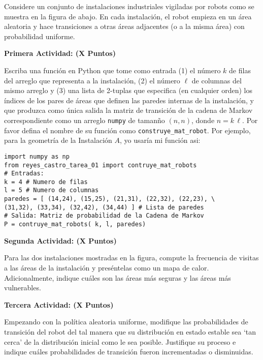 \documentclass[ a4paper, twoside, 11pt]{article}
\begin{document}
\begin{problem}
Considere un conjunto de instalaciones industriales vigiladas por robots como se muestra en la figura de abajo. En cada instalaci\'on, el robot empieza en un \'area aleatoria y hace transiciones a otras \'areas adjacentes (o a la misma \'area) con probabilidad uniforme. 

\begin{figure}[htb]
\centering
\def\svgwidth{0.9\columnwidth}

\end{figure}

\textbf{Primera Actividad: (X Puntos)}

Escriba una funci\'on en Python que tome como entrada (1) el n\'umero $k$ de filas del arreglo que representa a la instalaci\'on, (2) el n\'umero $\ell$ de columnas del mismo arreglo y (3) una lista de 2-tuplas que especifica (en cualquier orden) los \'indices de los pares de \'areas que definen las paredes internas de la instalaci\'on, y que produzca como \'unica salida la matriz de transici\'on de la cadena de Markov correspondiente como un arreglo {\tt numpy} de taman\~no $(n,n)$, donde $n = k \, \ell$. Por favor defina el nombre de su funci\'on como {\tt construye\_mat\_robot}. Por ejemplo, para la geometr\'ia de la Instalaci\'on $A$, yo usar\'ia mi funci\'on asi:
\halfskip

\begin{center}
\begin{minipage}{0.9\textwidth}
\begin{verbatim}
import numpy as np
from reyes_castro_tarea_01 import contruye_mat_robots
# Entradas:
k = 4 # Numero de filas
l = 5 # Numero de columnas
paredes = [ (14,24), (15,25), (21,31), (22,32), (22,23), \
(31,32), (33,34), (32,42), (34,44) ] # Lista de paredes
# Salida: Matriz de probabilidad de la Cadena de Markov
P = contruye_mat_robots( k, l, paredes)
\end{verbatim}
\end{minipage}
\end{center}
\fullskip

\textbf{Segunda Actividad: (X Puntos)}

Para las dos instalaciones mostradas en la figura, compute la frecuencia de visitas a las \'areas de la instalaci\'on y pres\'entelas como un mapa de calor. Adicionalmente, indique cu\'ales son las \'areas m\'as seguras y las \'areas m\'as vulnerables. 

\textbf{Tercera Actividad: (X Puntos)}

Empezando con la pol\'itica aleatoria uniforme, modifique las probabilidades de transici\'on del robot del tal manera que su distribuci\'on en estado estable sea `tan cerca' de la distribuci\'on inicial como le sea posible. Justifique su proceso e indique cu\'ales probabilidades de transici\'on fueron incrementadas o disminuidas. 

\end{problem}
\vspace{\baselineskip}
\end{document}
